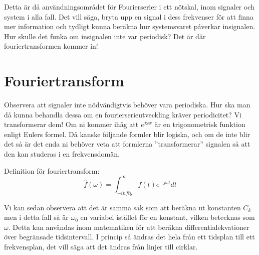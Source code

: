 \documentclass{article}
\begin{document}
Detta är då användningsområdet för Fourierserier i ett nötskal, inom signaler och system i alla fall. Det vill säga, bryta upp en signal i dess frekvenser för att finna mer information och tydligt kunna beräkna hur systemsvaret påverkar insignalen. Hur skulle det funka om insignalen inte var periodisk? \newline
Det är där fouriertransformen kommer in!

\section{Fouriertransform}
Observera att signaler inte nödvändigtvis behöver vara periodiska. Hur ska man då kunna behandla dessa om en fourierserieutveckling kräver periodicitet? Vi transformerar dem! Om ni kommer ihåg att $e^{j\omega x}$ är en trigonometrisk funktion enligt Eulers formel. Då kanske följande formler blir logiska, och om de inte blir det så är det enda ni behöver veta att formlerna ''transformerar'' signalen så att den kan studeras i en frekvensdomän.

Definition för fouriertransform:
$$\hat{f}(\omega) = \int_{-infty}^{\infty} f(t) e^{-j \omega t} dt$$

Vi kan sedan observera att det är samma sak som att beräkna ut konstanten $C_k$ men i detta fall så är $\omega_0$ en variabel istället för en konstant, vilken betecknas som $\omega$. 
Detta kan användas inom matematiken för att beräkna differentialekvationer över begränsade tidsintervall. I princip så ändras det hela från ett tidsplan till ett frekvensplan, det vill säga att det ändras från linjer till cirklar. 
\end{document}
